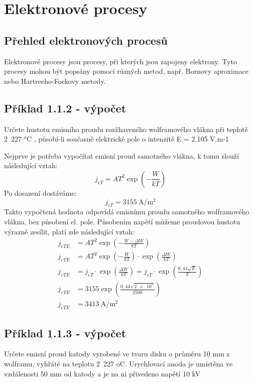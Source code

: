 \section{Elektronové procesy}

\subsection{Přehled elektronových procesů}

Elektronové procesy jsou procesy, při kterých jsou zapojeny elektrony. Tyto procesy mohou být popsány pomocí různých metod, např. Bornovy aproximace nebo Hartreeho-Fockovy metody.

\subsection{Příklad 1.1.2 - výpočet}
\begin{zadani}
    Určete hustotu emisního proudu rozžhaveného wolframového vlákna 
    při teplotě 2 227 °C , působí-li současně elektrické pole o intenzitě 
    E = 2.105 V.m-1
\end{zadani}

Nejprve je potřeba vypočítat emisní proud samotného vlákna, k tomu slouží následující vztah:
\[
    j_{eT} = A T^2 \exp\left(-\frac{W}{kT}\right)
\]
Po dosazení dostáváme:
\[
    j_{eT} =\qty{3155}{\ampere\per\square\meter}
\]
Takto vypočtená hodnota odpovídá emisnímu proudu samotného wolframového vlákna, bez působení el. pole. Působením napětí můžeme proudovou hustotu výrazně zesílit, platí zde následující vztah:
\begin{align*}
    j_{eTE} &= A T^2 \exp\left(-\frac{W-\Delta W}{kT}\right) \\
    j_{eTE} &= A T^2 \exp\left(-\frac{W}{kT}\right) \cdot \exp\left(\frac{\Delta W}{kT}\right) \\
    j_{eTE} &= j_{eT} \cdot \exp\left(\frac{\Delta W}{kT}\right)= j_{eT} \cdot \exp\left(\frac{0,44\sqrt{E} }{T}\right)\\
    j_{eTE} &= \num{3155}\exp\left(\frac{0,44\sqrt{\num{2e5}} }{\num{2500}}\right) \\
    j_{eTE} &= \qty{3413}{\ampere\per\square\meter }
\end{align*}



\subsection{Příklad 1.1.3 - výpočet}
\begin{zadani}
    Určete emisní proud katody vyrobené ve tvaru disku o průměru 10 mm
    z wolframu, vyhřáté na teplotu 2 227 oC. Urychlovací anoda je umístěna 
    ve vzdálenosti  50 mm  od katody a je na ni přivedeno napětí  10 kV
\end{zadani}

